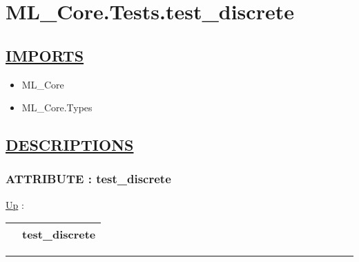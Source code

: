 \chapter*{ML\_Core.Tests.test\_discrete}
\hypertarget{ecldoc:toc:ML_Core.Tests.test_discrete}{}

\section*{\underline{IMPORTS}}
\begin{itemize}
\item ML\_Core
\item ML\_Core.Types
\end{itemize}

\section*{\underline{DESCRIPTIONS}}
\subsection*{ATTRIBUTE : test\_discrete}
\hypertarget{ecldoc:ml_core.tests.test_discrete}{}
\hyperlink{ecldoc:toc:ML_Core/Tests}{Up} :

{\renewcommand{\arraystretch}{1.5}
\begin{tabularx}{\textwidth}{|>{\raggedright\arraybackslash}l|X|}
\hline
\hspace{0pt} & test\_discrete \\
\hline
\end{tabularx}
}

\par


\rule{\linewidth}{0.5pt}
